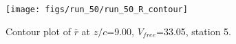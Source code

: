 \begin{figure}[H]
\centering
\texttt{[image: figs/run\_50/run\_50\_R\_contour]}
\caption{Contour plot of $\overline{r}$ at $z/c$=9.00, $V_{free}$=33.05, station 5.}
\end{figure}


